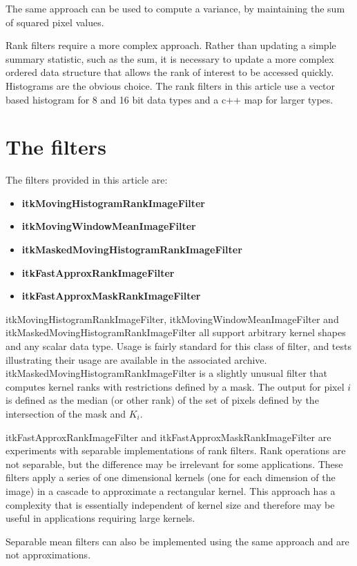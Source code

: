 \documentclass{InsightArticle}
\begin{document}
The same approach can be used to compute a variance, by maintaining
the sum of squared pixel values.

Rank filters require a more complex approach. Rather than updating a
simple summary statistic, such as the sum, it is necessary to update a
more complex ordered data structure that allows the rank of interest
to be accessed quickly. Histograms are the obvious choice. The rank
filters in this article use a vector based histogram for 8 and 16 bit
data types and a c++ map for larger types.

\section{The filters}
The filters provided in this article are:
\begin{itemize}
\item {\bf itkMovingHistogramRankImageFilter}
\item {\bf itkMovingWindowMeanImageFilter}
\item {\bf itkMaskedMovingHistogramRankImageFilter}
\item {\bf itkFastApproxRankImageFilter}
\item {\bf itkFastApproxMaskRankImageFilter}
\end{itemize}

itkMovingHistogramRankImageFilter, itkMovingWindowMeanImageFilter and
itkMaskedMovingHistogramRankImageFilter all support arbitrary kernel
shapes and any scalar data type. Usage is fairly standard for this
class of filter, and tests illustrating their usage are available in
the associated archive. itkMaskedMovingHistogramRankImageFilter is a
slightly unusual filter that computes kernel ranks with restrictions
defined by a mask. The output for pixel $i$ is defined as the median
(or other rank) of the set of pixels defined by the intersection of
the mask and $K_i$.

itkFastApproxRankImageFilter and itkFastApproxMaskRankImageFilter are
experiments with separable implementations of rank filters. Rank
operations are not separable, but the difference may be irrelevant for
some applications. These filters apply a series of one dimensional
kernels (one for each dimension of the image) in a cascade to
approximate a rectangular kernel. This approach has a complexity that
is essentially independent of kernel size and therefore may be useful
in applications requiring large kernels.

Separable mean filters can also be implemented using the same approach
and are not approximations.
\end{document}
